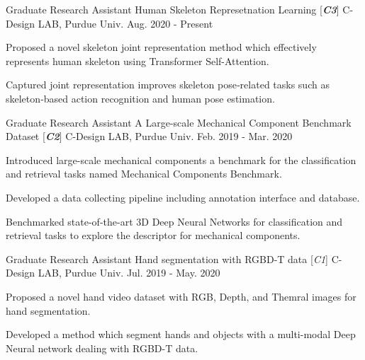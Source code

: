 

\begin{cventries}

\cventry
{Graduate Research Assistant} %
{Human Skeleton Represetnation Learning [\textit{\textbf{C3}}]} %
{C-Design LAB, Purdue Univ.} %
{Aug. 2020 - Present} %
{ %
\begin{cvitems}
\item {Proposed a novel skeleton joint representation method which effectively represents human skeleton using Transformer Self-Attention.}
\item {Captured joint representation improves skeleton pose‐related tasks such as skeleton‐based action recognition and human pose estimation.}
\end{cvitems}
}

\cventry
{Graduate Research Assistant} %
{A Large-scale Mechanical Component Benchmark Dataset [\textit{\textbf{C2}}]} %
{C-Design LAB, Purdue Univ.} %
{Feb. 2019 - Mar. 2020} %
{ %
\begin{cvitems}
\item {Introduced large-scale mechanical components a benchmark for the classification and retrieval tasks named Mechanical Components Benchmark.}
\item {Developed a data collecting pipeline including annotation interface and database.}
\item {Benchmarked state-of-the-art 3D Deep Neural Networks for classification and retrieval tasks to explore the descriptor for mechanical components.}
\end{cvitems}
}

\cventry
{Graduate Research Assistant} %
{Hand segmentation with RGBD-T data [\textit{\textit{C1}}]} %
{C-Design LAB, Purdue Univ.} %
{Jul. 2019 - May. 2020} %
{ %
\begin{cvitems}
\item {Proposed a novel hand video dataset with RGB, Depth, and Themral images for hand segmentation.}
\item {Developed a method which segment hands and objects with a multi-modal Deep Neural network dealing with RGBD-T data.}
\end{cvitems}
}


\end{cventries}
